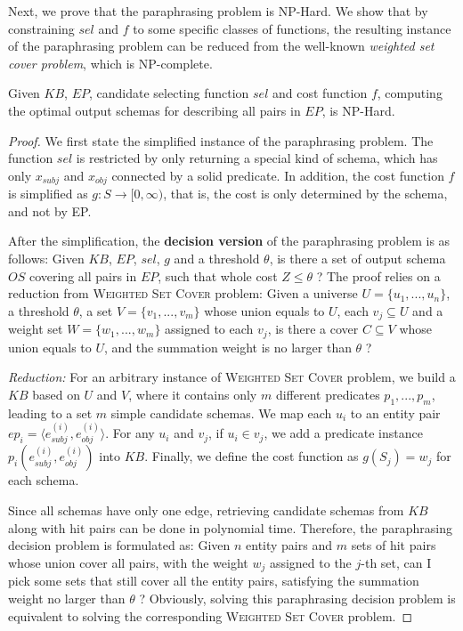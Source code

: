 
Next, we prove that the paraphrasing problem is NP-Hard.
We show that by constraining $sel$ and $f$ to some specific classes of
functions, the resulting instance of the paraphrasing problem can
be reduced from the well-known {\em weighted set cover problem},
which is NP-complete.

\begin{thm}
Given $KB$, $EP$, candidate selecting function $sel$ and cost function $f$,
computing the optimal output schemas for describing all pairs in $EP$, is NP-Hard.
\end{thm}

\begin{proof}
We first state the simplified instance of the paraphrasing problem.
The function $sel$ is restricted by only returning a special kind
of schema, which has only $x_{subj}$ and $x_{obj}$ connected by a solid
predicate. In addition, the cost function $f$ is simplified as
$g: S \rightarrow [0, \infty)$, that is,
the cost is only determined by the schema, and not by EP.

After the simplification, the \textbf{decision version} of the
paraphrasing problem is as follows:
Given $KB$, $EP$, $sel$, $g$ and a threshold $\theta$, is there a set of output schema $OS$
covering all pairs in $EP$, such that whole cost $Z \leq \theta$ ?
The proof relies on a reduction from \textsc{Weighted Set Cover} problem:
Given a universe $U = \{u_1, ..., u_n\}$, a threshold $\theta$, a set $V = \{v_1, ..., v_m\}$
whose union equals to $U$, each $v_j \subseteq U$ and a weight set $W = \{w_1, ..., w_m\}$ assigned to each $v_j$,
is there a cover $C \subseteq V$ whose union equals to $U$, and the summation weight is no larger than $\theta$ ?

\textit{Reduction:} For an arbitrary instance of \textsc{Weighted Set Cover} problem,
we build a $KB$ based on $U$ and $V$, where it contains only $m$ different predicates $p_1, ..., p_m$,
leading to a set $m$ simple candidate schemas.
We map each $u_i$ to an entity pair $ep_i = \langle e_{subj}^{(i)}, e_{obj}^{(i)} \rangle $.
For any $u_i$ and $v_j$, if $u_i \in v_j$, we add a predicate instance $p_i(e_{subj}^{(i)}, e_{obj}^{(i)})$ into $KB$.
Finally, we define the cost function as $g(S_j) = w_j$ for each schema.

Since all schemas have only one edge, retrieving candidate schemas from $KB$
along with hit pairs can be done in polynomial time. Therefore, the paraphrasing decision problem
is formulated as: Given $n$ entity pairs and $m$ sets of hit pairs whose union cover all pairs,
with the weight $w_j$ assigned to the $j$-th set, can I pick some sets that still cover all
the entity pairs, satisfying the summation weight no larger than $\theta$ ?
Obviously, solving this paraphrasing decision problem is equivalent to
solving the corresponding \textsc{Weighted Set Cover} problem.
\end{proof}

